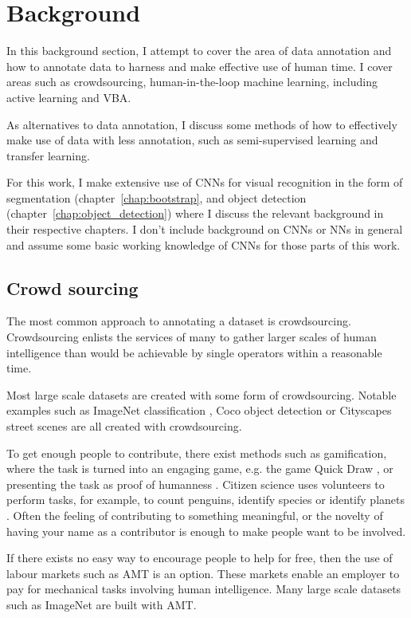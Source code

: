 \section {Background}

In this background section, I attempt to cover the area of data annotation and how to annotate data to harness and make effective use of human time. I cover areas such as crowdsourcing, human-in-the-loop machine learning, including active learning and \gls{VBA}.

As alternatives to data annotation, I discuss some methods of how to effectively make use of data with less annotation, such as semi-supervised learning and transfer learning. 

For this work, I make extensive use of \gls{CNN}s for visual recognition in the form of segmentation (chapter~\ref{chap:bootstrap}, and object detection (chapter~\ref{chap:object_detection}) where I discuss the relevant background in their respective chapters. I don't include background on \gls{CNN}s or \gls{NN}s in general and assume some basic working knowledge of \gls{CNN}s for those parts of this work.


\subsection {Crowd sourcing}

The most common approach to annotating a dataset is crowdsourcing. Crowdsourcing enlists the services of many to gather larger scales of human intelligence than would be achievable by single operators within a reasonable time.

Most large scale datasets are created with some form of crowdsourcing. Notable examples such as ImageNet classification \cite{JiaDeng2009}, Coco object detection \cite{Lin2014} or Cityscapes street scenes \cite{Cordts2016} are all created with crowdsourcing. 

To get enough people to contribute, there exist methods such as gamification, where the task is turned into an engaging game, e.g. the game Quick Draw \cite{Ha2017}, or presenting the task as proof of humanness \cite{Goodfellow2013a}. Citizen science uses volunteers to perform tasks, for example, to count penguins, identify species or identify planets \cite{Simpson2014, Masters2016}. Often the feeling of contributing to something meaningful, or the novelty of having your name as a contributor is enough to make people want to be involved.

If there exists no easy way to encourage people to help for free, then the use of labour markets such as \gls{AMT} is an option. These markets enable an employer to pay for mechanical tasks involving human intelligence. Many large scale datasets such as ImageNet \cite{Russakovsky2015} are built with \gls{AMT}. 


